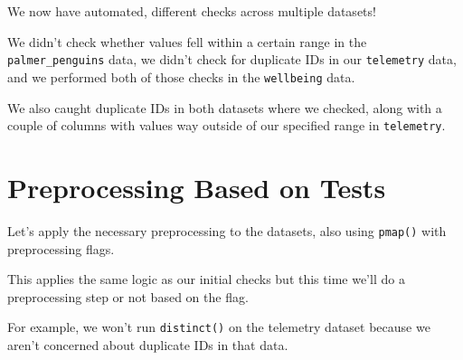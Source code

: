 \documentclass[
  letterpaper,
  DIV=11,
  numbers=noendperiod]{scrreprt}
\begin{document}
We now have automated, different checks across multiple datasets!

We didn't check whether values fell within a certain range in the
\texttt{palmer\_penguins} data, we didn't check for duplicate IDs in our
\texttt{telemetry} data, and we performed both of those checks in the
\texttt{wellbeing} data.

We also caught duplicate IDs in both datasets where we checked, along
with a couple of columns with values way outside of our specified range
in \texttt{telemetry}.

\hypertarget{preprocessing-based-on-tests}{%
\section{Preprocessing Based on
Tests}\label{preprocessing-based-on-tests}}

Let's apply the necessary preprocessing to the datasets, also using
\texttt{pmap()} with preprocessing flags.

This applies the same logic as our initial checks but this time we'll do
a preprocessing step or not based on the flag.

For example, we won't run \texttt{distinct()} on the telemetry dataset
because we aren't concerned about duplicate IDs in that data.
\end{document}
